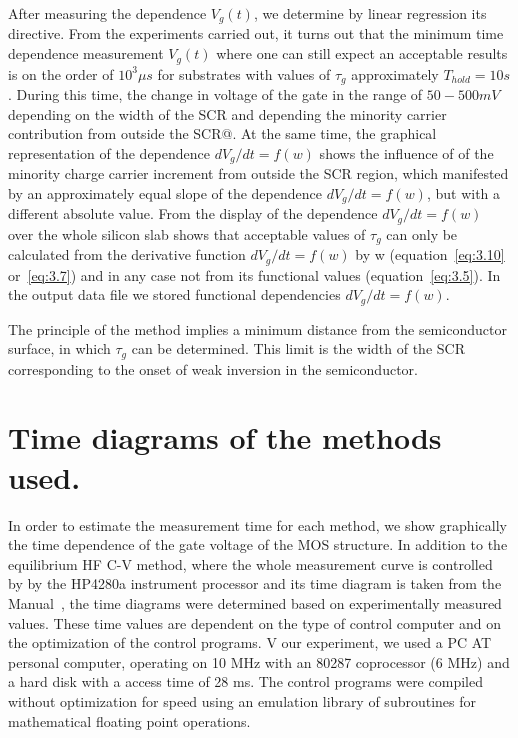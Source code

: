 After measuring the dependence $V_{g}(t)$, we determine by linear
regression its directive. From the experiments carried out, it turns
out that the minimum time dependence measurement $V_{g}(t)$ where one
can still expect an acceptable results is on the order of
$10^{3}\mu{s}$ for substrates with values of $\tau_g$ approximately
$T_{hold}=10s$. During this time, the change in voltage of the gate in
the range of $50-500 mV$ depending on the width of the SCR and
depending the minority carrier contribution from outside the SCR@. At
the same time, the graphical representation of the dependence
${dV_g}/{dt}=f(w)$ shows the influence of of the minority charge
carrier increment from outside the SCR region, which manifested by an
approximately equal slope of the dependence ${dV_g}/{dt}=f(w)$,
but with a different absolute value. From the display of the
dependence ${dV_g}/{dt}=f(w)$ over the whole silicon slab shows
that acceptable values of $\tau_{g}$ can only be calculated from the
derivative function ${dV_g}/{dt}=f(w)$ by w
(equation~\ref{eq:3.10} or~\ref{eq:3.7}) and in any case not from its
functional values (equation~\ref{eq:3.5}). In the output data file we
stored functional dependencies ${dV_g}/{dt}=f(w)$.

The principle of the method implies a minimum distance from the
semiconductor surface, in which $\tau_{g}$ can be determined. This
limit is the width of the SCR corresponding to the onset of weak
inversion in the semiconductor.

\section{Time diagrams of the methods used.}\label{sec:5.4}

In order to estimate the measurement time for each method, we show
graphically the time dependence of the gate voltage of the MOS
structure. In addition to the equilibrium HF C-V method, where the
whole measurement curve is controlled by by the HP4280a instrument
processor and its time diagram is taken from the Manual~\cite{5.7},
the time diagrams were determined based on experimentally measured
values. These time values are dependent on the type of control
computer and on the optimization of the control programs. V our
experiment, we used a PC AT personal computer, operating on 10 MHz
with an 80287 coprocessor (6 MHz) and a hard disk with a access time
of 28 ms. The control programs were compiled without optimization for
speed using an emulation library of subroutines for mathematical
floating point operations.

